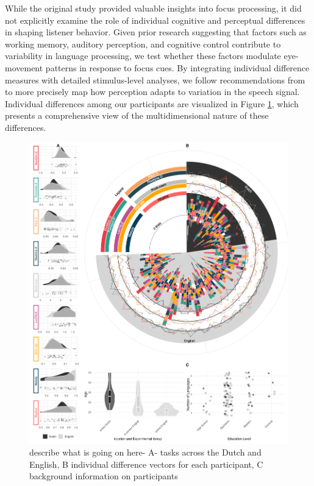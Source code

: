 While the original study provided valuable insights into focus processing, it did not explicitly examine the role of individual cognitive and perceptual differences in shaping listener behavior. Given prior research suggesting that factors such as working memory, auditory perception, and cognitive control contribute to variability in language processing, we test whether these factors modulate eye-movement patterns in response to focus cues. By integrating individual difference measures with detailed stimulus-level analyses, we follow recommendations from \cite{xie2023adaptive} to more precisely map how perception adapts to variation in the speech signal. Individual differences among our participants are visualized in Figure \ref{fig:combined_plot}, which presents a comprehensive view of the multidimensional nature of these differences. 

\clearpage
\begin{figure}[H]  %
    \centering
    \includegraphics[width=\textwidth,height=\textheight,keepaspectratio]{viz/combined_plot_circle.png}
    \caption{describe what is going on here- A- tasks across the Dutch and English, B individual difference vectors for each participant, C background information on participants}
    \label{fig:combined_plot}
\end{figure}
\clearpage


